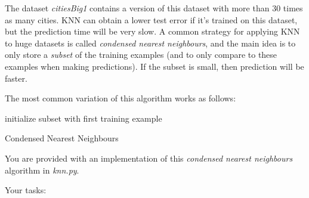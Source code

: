 \documentclass{article}
\begin{document}
The dataset \emph{citiesBig1} contains a version of this dataset with more than 30 times as many cities. KNN can obtain a lower test error if it's trained on this dataset, but the prediction time will be very slow.
A common strategy for applying KNN to huge datasets is called \emph{condensed nearest neighbours}, and the main idea is to only store a \emph{subset}
of the training examples (and to only compare to these examples when making predictions). If the subset is small, then prediction will be faster.

The most common variation of this algorithm works as follows:

\begin{algorithm}[H]
 initialize subset with first training example\;
 \caption{Condensed Nearest Neighbours}
\end{algorithm}

You are provided with an implementation of this \emph{condensed nearest neighbours} algorithm in \emph{knn.py}.

Your tasks:
\end{document}
